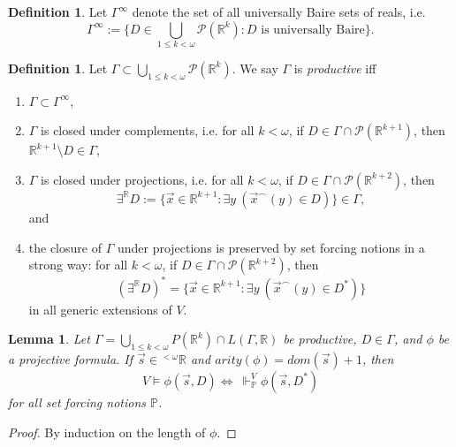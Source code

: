\documentclass[12pt, twoside]{memoir}
\numberwithin{equation}{section}
\newtheorem{lem}[thm]{Lemma}
\theoremstyle{definition}
\newtheorem{defi}[thm]{Definition}
\theoremstyle{remark}
\theoremstyle{definition}
\theoremstyle{definition}
\theoremstyle{definition}
\theoremstyle{remark}
\begin{document}
\begin{defi}
Let $\Gamma^{\infty}$ denote the set of all universally Baire sets of reals, i.e. 
\begin{equation*}
    \Gamma^{\infty} := \{D \in \bigcup_{1 \leq k < \omega} \mathcal{P}(\mathbb{R}^k) : D \text{ is universally Baire}\}.
\end{equation*}
\end{defi}

\begin{defi}
Let $\Gamma \subset \bigcup_{1 \leq k < \omega} \mathcal{P}(\mathbb{R}^k)$. We say $\Gamma$ is \emph{productive} iff
\begin{enumerate}[label=(\alph*)]
    \item $\Gamma \subset \Gamma^{\infty}$,
    \item $\Gamma$ is closed under complements, i.e. for all $k < \omega$, if $D \in \Gamma \cap \mathcal{P}(\mathbb{R}^{k+1})$, then $\mathbb{R}^{k+1} \setminus D \in \Gamma$,
    \item $\Gamma$ is closed under projections, i.e. for all $k < \omega$, if $D \in \Gamma \cap \mathcal{P}(\mathbb{R}^{k+2})$, then
    \begin{equation*}
        \exists^{\mathbb{R}} D := \{\Vec{x} \in \mathbb{R}^{k+1} : \exists y \ (\Vec{x}^{\frown}(y) \in D)\} \in \Gamma,
    \end{equation*}
    and
    \item the closure of $\Gamma$ under projections is preserved by set forcing notions in a strong way: for all $k < \omega$, if $D \in \Gamma \cap \mathcal{P}(\mathbb{R}^{k+2})$, then
    \begin{equation*}
        (\exists^{\mathbb{R}} D)^* = \{\Vec{x} \in \mathbb{R}^{k+1} : \exists y \ (\Vec{x}^{\frown}(y) \in D^*)\}
    \end{equation*}
    in all generic extensions of $V$.
\end{enumerate}
\end{defi}

\begin{lem}\label{prod}
Let $\Gamma  = \bigcup_{1 \leq k < \omega} P(\mathbb{R}^{k}) \cap L(\Gamma, \mathbb{R})$ be productive, $D \in \Gamma$, and $\phi$ be a projective formula. If $\Vec{s} \in {^{< \omega}{\mathbb{R}}}$ and $arity(\phi) = dom(\Vec{s}) + 1$, then 
\begin{equation*}
    V \models \phi(\Vec{s}, D) \iff \ \Vdash^V_{\mathbb{P}} \phi(\Vec{s}, D^*)
\end{equation*}
for all set forcing notions $\mathbb{P}$.
\end{lem}
\begin{proof}
By induction on the length of $\phi$.
\end{proof}
\end{document}

